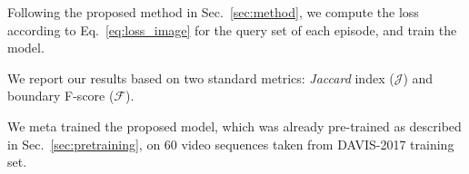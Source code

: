 \documentclass[10pt,twocolumn,letterpaper]{article}
\begin{document}
Following the proposed method in Sec.~\ref{sec:method}, we compute the loss according to Eq.~\ref{eq:loss_image} for the query set of each episode, and train the model.

We report our results based on two standard metrics: {\it Jaccard} index ($\mathcal{J}$) and boundary F-score ($\mathcal{F}$).

We meta trained the proposed model, which was already pre-trained as described in Sec.~\ref{sec:pretraining}, on $60$ video sequences taken from DAVIS-2017 training set. 
\end{document}
